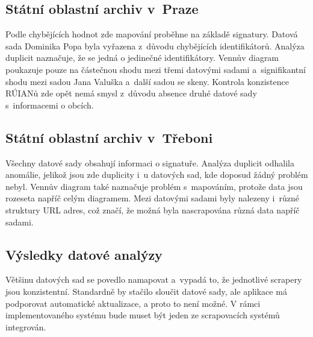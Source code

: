 \subsection{Státní oblastní archiv v~Praze}
Podle chybějících hodnot zde mapování proběhne na základě signatury. Datová sada Dominika Popa byla vyřazena z~důvodu chybějících identifikátorů. Analýza duplicit naznačuje, že se jedná o jedinečné identifikátory. Vennův diagram poukazuje pouze na částečnou shodu mezi třemi datovými sadami a~signifikantní shodu mezi sadou Jana Valuška a~další sadou se skeny. Kontrola konzistence RÚIANů zde opět nemá smysl z~důvodu absence druhé datové sady s~informacemi o obcích.

\subsection{Státní oblastní archiv v~Třeboni}
Všechny datové sady obsahují informaci o signatuře. Analýza duplicit odhalila anomálie, jelikož jsou zde duplicity i~u datových sad, kde doposud žádný problém nebyl. Vennův diagram také naznačuje problém s~mapováním, protože data jsou rozeseta napříč celým diagramem. Mezi datovými sadami byly nalezeny i~různé struktury URL adres, což značí, že možná byla nascrapována různá data napříč sadami.

\subsection{Výsledky datové analýzy}

Většinu datových sad se povedlo namapovat a~vypadá to, že jednotlivé scrapery jsou konzistentní. Standardně by stačilo sloučit datové sady, ale aplikace má podporovat automatické aktualizace, a proto to není možné. V rámci implementovaného systému bude muset být jeden ze scrapovacích systémů integrován.
